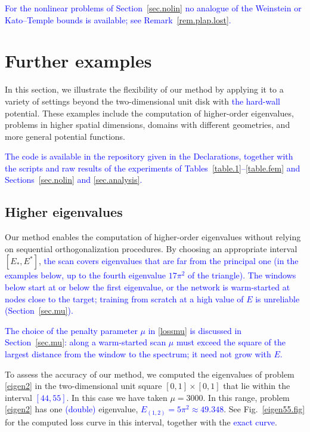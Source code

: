 \documentclass[10pt]{amsart}
\newcommand{\rev}[1]{\textcolor{blue}{#1}}
\theoremstyle{definition}
\theoremstyle{remark}
\theoremstyle{plain}
\begin{document}
\noindent\rev{For the nonlinear problems of Section~\ref{sec.nolin} no analogue of the Weinstein or
Kato--Temple bounds is available; see Remark~\ref{rem.plap.lost}.}

\section{Further examples}\label{sec.examples}

In this section, we illustrate the flexibility of our method by applying it to a variety of settings beyond the two-dimensional unit disk with \rev{the hard-wall} potential. These examples include the computation of higher-order eigenvalues, problems in higher spatial dimensions, domains with different geometries, and more general potential functions.

\rev{The code is available in the repository given in the Declarations, together with the scripts
and raw results of the experiments of Tables~\ref{table.1}--\ref{table.fem} and
Sections~\ref{sec.nolin} and \ref{sec.analysis}.}

\subsection{Higher eigenvalues}
Our method enables the computation of higher-order eigenvalues without relying on sequential orthogonalization procedures. By choosing an appropriate interval $[E_*, E^*]$, \rev{the scan covers eigenvalues that are far from the principal one (in the examples below, up to the fourth eigenvalue $17\pi^2$ of the triangle). The windows below start at or below the first eigenvalue, or the network is warm-started at nodes close to the target; training from scratch at a high value of $E$ is unreliable (Section~\ref{sec.mu}).}

\rev{The choice of the penalty parameter $\mu$ in \eqref{lossmu} is discussed in Section~\ref{sec.mu}: along a warm-started scan $\mu$ must exceed the square of the largest distance from the window to the spectrum; it need not grow with $E$.}

To assess the accuracy of our method, we computed the eigenvalues of problem \eqref{eigen2} in the two-dimensional unit square $[0,1]\times[0,1]$ that lie within the interval \rev{$[44, 55]$}. In this case we have taken $\mu=3000$. In this range, problem \eqref{eigen2} has one \rev{(double)} eigenvalue, \rev{$E_{(1,2)}=5\pi^2\approx49.348$}. See Fig.~\ref{eigen55.fig} for the computed loss curve in this interval, together with the \rev{exact curve}.
\end{document}
